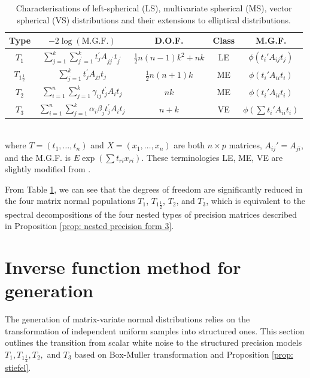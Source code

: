 \documentclass{amsart}
\theoremstyle{definition}
\numberwithin{equation}{section}
\begin{document}
        \begin{table}[!h]
        \caption{Characterisations of left-spherical (LS), multivariate spherical (MS), vector spherical (VS) distributions and their extensions to elliptical distributions.}
    \centering
    \begin{tabular}{|c|c|c|c|c|}
        \hline
        Type & $-2\log(\text{M.G.F.})$  & D.O.F. & Class & M.G.F.\\
        \hline
        $T_{1}$ & $ \sum_{j=1}^{k}\sum_{j^{\prime}=1}^{k}
         t_{j}^{\prime}{ A}_{jj^{\prime}} t_{j^{\prime}}$ & $\frac{1}{2}n(n-1)k^2 + nk$ & LE & $\phi( t_{i}' A_{ij} t_{j})$\\
        \hline
        $T_{1\frac{1}{2}}$ &  $ \sum_{j=1}^{k} t_{j}^{\prime}{ A}_{jj} t_{j}$ & $\frac{1}{2}n(n+1)k$ & ME & $\phi( t_{i}' A_{ii} t_{i})$ \\
        \hline
        $T_{2}$ & $ \sum_{i=1}^{n}\sum_{j=1}^{k}\gamma_{ij}  t_{j}^{\prime}{ A}_{i} t_{j} $ & $ nk$ &  ME & $\phi( t_{i}' A_{ii} t_{i})$ \\
        \hline
        $T_{3}$ & $\sum_{i=1}^{n}\sum_{j=1}^{k}\alpha_{i}\beta_{j}  t_{j}^{\prime}{ A}_{i} t_{j}  $ & $n+k$ & VE & $\phi(\sum  t_{i}' A_{ii} t_{i})$\\
        \hline
    \end{tabular}\\
    \label{tab: matrix normal}
    where $ T = ( t_{1},\dots, t_{n})$ and $ X= ( x_{1},\dots, x_{n})$ are both $n \times p$ matrices, $ A_{ij}'=  A_{ji}$, and the M.G.F. is ${E}\exp (\sum t_{ri}x_{ri})$. These terminologies LE, ME, VE are slightly modified from \cite{1990Generalized}.
\end{table}

From Table \ref{tab: matrix normal}, we can see that the degrees of freedom are significantly reduced in the four matrix normal populations $T_{1}$, $T_{1\frac{1}{2}}$, $T_{2}$, and $T_{3}$, which is equivalent to the spectral decompositions of the four nested types of precision matrices described in Proposition \ref{prop: nested precision form 3}. %


\section{Inverse function method for generation}

The generation of matrix-variate normal distributions relies on the transformation of independent uniform samples into structured ones. This section outlines the transition from scalar white noise to the structured precision models $T_1, T_{1\frac{1}{2}}, T_2,$ and $T_3$ based on Box-Muller transformation and Proposition \ref{prop: stiefel}.
\end{document}
